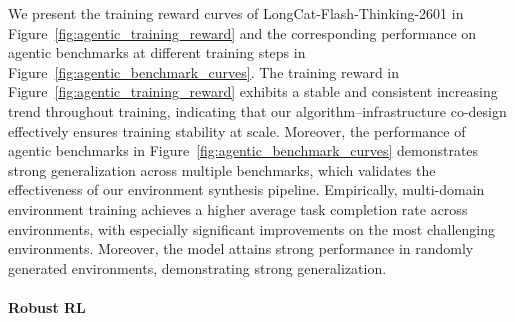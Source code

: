 \documentclass{article}
\newcommand{\longcat}{LongCat-Flash-Thinking-2601\xspace}
\begin{document}
We present the training reward curves of \longcat in Figure~\ref{fig:agentic_training_reward} and the corresponding performance on agentic benchmarks at different training steps in Figure~\ref{fig:agentic_benchmark_curves}. The training reward in Figure~\ref{fig:agentic_training_reward}  exhibits a stable and consistent increasing trend throughout training, indicating that our algorithm–infrastructure co-design effectively ensures training stability at scale. 
Moreover, the performance of agentic benchmarks in Figure~\ref{fig:agentic_benchmark_curves} demonstrates strong generalization across multiple benchmarks, which validates the effectiveness of our environment synthesis pipeline.
Empirically, multi-domain environment training achieves a higher average task completion rate across environments, with especially significant improvements on the most challenging environments.
Moreover, the model attains strong performance in randomly generated environments, demonstrating strong generalization.



\paragraph{Robust RL}
\begin{table}[t]
\centering
\caption{Performance comparison across different training strategies.}
\label{tab:robust_rl_results}
\end{table}
\end{document}
